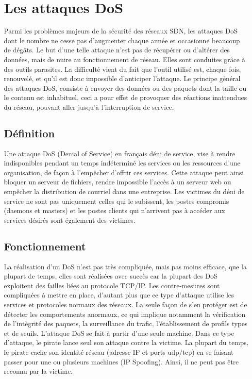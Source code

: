 \section{Les attaques DoS}
Parmi les problèmes majeurs de la sécurité des réseaux SDN, les attaques DoS dont le nombre ne cesse pas d’augmenter chaque année et occasionne beaucoup de dégâts. Le but d’une telle attaque n’est pas de récupérer ou d’altérer des données, mais de nuire au fonctionnement de réseau. Elles sont conduites grâce à des outils parasites. La difficulté vient du fait que l’outil utilisé est, chaque fois, renouvelé, et qu’il est donc impossible d’anticiper l’attaque. Le principe général des attaques DoS, consiste à envoyer des données ou des paquets dont la taille ou le contenu est inhabituel, ceci a pour effet de provoquer des réactions inattendues du réseau, pouvant aller jusqu’à l’interruption de service.

\subsection{Définition}
Une attaque DoS (Denial of Service) en français déni de service, vise à rendre indisponibles pendant un temps indéterminé les services ou les ressources d’une organisation, de façon à l’empêcher d’offrir ces services. Cette attaque peut ainsi bloquer un serveur de fichiers, rendre impossible l’accès à un serveur web ou empêcher la distribution de courriel dans une entreprise. Les victimes du déni de service ne sont pas uniquement celles qui le subissent, les postes compromis (daemons et masters) et les postes clients qui n’arrivent pas à accéder aux services désirés sont également des victimes.

\subsection{Fonctionnement}
La réalisation d’un DoS n’est pas très compliquée, mais pas moins efficace, que la plupart de temps, elles sont réalisées avec succès car la plupart des DoS exploitent des failles liées au protocole TCP/IP. Les contre-mesures sont compliquées à mettre en place, d’autant plus que ce type d’attaque utilise les services et protocoles normaux des réseaux. La seule façon de s’en protéger est de détecter les comportements anormaux, ce qui implique notamment la vérification de l’intégrité des paquets, la surveillance du trafic, l’établissement de profils types et de seuils. 
L’attaque DoS se fait à partir d’une seule machine. Dans ce type d’attaque, le pirate lance seul son attaque contre la victime. La plupart du temps, le pirate cache son identité réseau (adresse IP et ports udp/tcp) en se faisant passer pour une ou plusieurs machines (IP Spoofing). Ainsi, il ne peut pas être reconnu par la victime.

